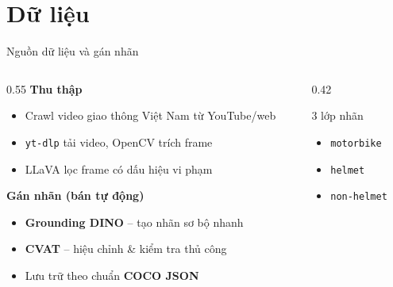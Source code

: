 \section{Dữ liệu}

\begin{frame}{Nguồn dữ liệu và gán nhãn}

\begin{columns}[T]
\begin{column}{0.55\textwidth}
  \textbf{Thu thập}
  \begin{itemize}
    \item Crawl video giao thông Việt Nam từ YouTube/web
    \item \texttt{yt-dlp} tải video, OpenCV trích frame
    \item LLaVA lọc frame có dấu hiệu vi phạm
  \end{itemize}
  \vspace{0.4em}
  \textbf{Gán nhãn (bán tự động)}
  \begin{itemize}
    \item \textbf{Grounding DINO} -- tạo nhãn sơ bộ nhanh
    \item \textbf{CVAT} -- hiệu chỉnh \& kiểm tra thủ công
    \item Lưu trữ theo chuẩn \textbf{COCO JSON}
  \end{itemize}
\end{column}
\begin{column}{0.42\textwidth}
  \begin{block}{3 lớp nhãn}
    \begin{itemize}
      \item \texttt{motorbike}
      \item \texttt{helmet}
      \item \texttt{non-helmet}
    \end{itemize}
  \end{block}
\end{column}
\end{columns}

\end{frame}

